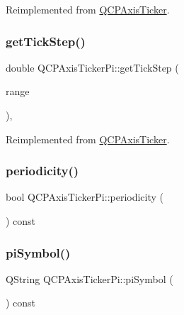 Reimplemented from \mbox{\hyperlink{class_q_c_p_axis_ticker_a8201eb4aa8be192bf786b126eb5ee089}{Q\+C\+P\+Axis\+Ticker}}.

\mbox{\label{class_q_c_p_axis_ticker_pi_a55301f0072983bd2d7c131a24e1779e7}} 
\subsubsection{\texorpdfstring{getTickStep()}{getTickStep()}}
{\footnotesize\ttfamily double Q\+C\+P\+Axis\+Ticker\+Pi\+::get\+Tick\+Step (\begin{DoxyParamCaption}\item[{const \mbox{\hyperlink{class_q_c_p_range}{Q\+C\+P\+Range}} \&}]{range }\end{DoxyParamCaption})\hspace{0.3cm}{\ttfamily [protected]}, {\ttfamily [virtual]}}



Reimplemented from \mbox{\hyperlink{class_q_c_p_axis_ticker_a910d69bcec2de37e92d8d4e1ecf201e2}{Q\+C\+P\+Axis\+Ticker}}.

\mbox{\label{class_q_c_p_axis_ticker_pi_aa320edf0a30386ce6a63c18050fbdfd8}} 
\subsubsection{\texorpdfstring{periodicity()}{periodicity()}}
{\footnotesize\ttfamily bool Q\+C\+P\+Axis\+Ticker\+Pi\+::periodicity (\begin{DoxyParamCaption}{ }\end{DoxyParamCaption}) const\hspace{0.3cm}{\ttfamily [inline]}}

\mbox{\label{class_q_c_p_axis_ticker_pi_a2fd785cd66a6f4f969ac2eca1b08e0f2}} 
\subsubsection{\texorpdfstring{piSymbol()}{piSymbol()}}
{\footnotesize\ttfamily Q\+String Q\+C\+P\+Axis\+Ticker\+Pi\+::pi\+Symbol (\begin{DoxyParamCaption}{ }\end{DoxyParamCaption}) const\hspace{0.3cm}{\ttfamily [inline]}}

